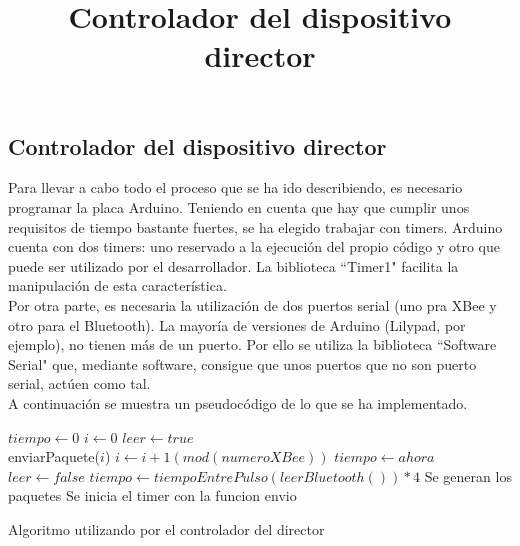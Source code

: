 \subsection{Controlador del dispositivo director}
\title{Controlador del dispositivo director}

Para llevar a cabo todo el proceso que se ha ido describiendo, es necesario programar
la placa Arduino. Teniendo en cuenta que hay que cumplir unos requisitos de tiempo bastante
fuertes, se ha elegido trabajar con timers. Arduino cuenta con dos timers: uno reservado
a la ejecución del propio código y otro que puede ser utilizado por el desarrollador.
La biblioteca ``Timer1" \cite{timeronearduino} facilita la manipulación de esta característica.\\

Por otra parte, es necesaria la utilización de dos puertos serial (uno pra XBee y otro para el Bluetooth).
La mayoría de versiones de Arduino (Lilypad, por ejemplo), no tienen más de un puerto.
Por ello se utiliza la biblioteca ``Software Serial" \cite{softwareserial} que, mediante software, consigue
que unos puertos que no son puerto serial, actúen como tal.\\

A continuación se muestra un pseudocódigo de lo que se ha implementado.\\
\begin{algorithm}
  \begin{algorithmic}[1]
     \State $tiempo\gets 0$
     \State $i\gets 0$
     \State $leer \gets true$\\

        \State enviarPaquete($i$)
        \State $i \gets i+1(mod(numeroXBee))$
        \State $tiempo \gets ahora$
      \EndIf
      \EndFunction\\

        \State $leer \gets false$
        \State $tiempo\gets tiempoEntrePulso(leerBluetooth())*4$
        \State Se generan los paquetes
        \State Se inicia el timer con la funcion envio
      \EndIf
     \EndIf
    \EndWhile
  \caption{Algoritmo utilizando por el controlador del director}
  \end{algorithmic}
\end{algorithm}



